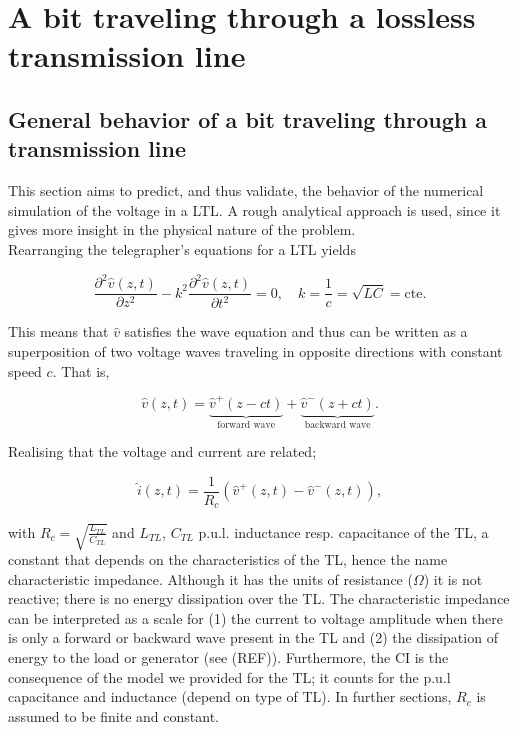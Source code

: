 \section{A bit traveling through a lossless transmission line}

\subsection{General behavior of a bit traveling through a transmission line}
This section aims to predict, and thus validate, the behavior of the numerical simulation of the voltage in a LTL. A rough analytical approach is used, since it gives more insight in the physical nature of the problem.  \\

Rearranging the telegrapher's equations for a LTL yields

\begin{equation}
\frac{\partial^2\hat{v}(z, t)}{\partial z^2} - k^2\frac{\partial^2 \hat{v}(z, t)}{\partial t^2} = 0, \quad k = \frac{1}{c}= \sqrt{LC} = \mathrm{cte}.
\label{tele}
\end{equation}

This means that $\hat{v}$ satisfies the wave equation and thus can be written as a superposition of two voltage waves traveling in opposite directions with constant speed $c$. That is,

\begin{equation}
\hat{v}(z, t) = \underbrace{\hat{v}^{+}(z - ct)}_{\text{forward wave}} + \underbrace{\hat{v}^{-}(z + ct)}_{\text{backward wave}}.
\end{equation}

Realising that the voltage and current are related;

\begin{equation}
\hat{i}(z, t) = \frac{1}{R_c}(\hat{v}^{+}(z, t) - \hat{v}^{-}(z, t)),
\end{equation}

with $R_c = \sqrt{\frac{L_{TL}}{C_{TL}}}$ and $L_{TL}$, $C_{TL}$ p.u.l. inductance resp. capacitance of the TL, a constant that depends on the characteristics of the TL, hence the name characteristic impedance. Although it has the units of resistance ($\Omega$) it is not reactive; there is no energy dissipation over the TL. The characteristic impedance can be interpreted as a scale for (1) the current to voltage amplitude when there is only a forward or backward wave present in the TL and (2) the dissipation of energy to the load or generator (see (REF)). Furthermore, the CI is the consequence of the model we provided for the TL; it counts for the p.u.l capacitance and inductance (depend on type of TL). In further sections, $R_c$ is assumed to be finite and constant.

